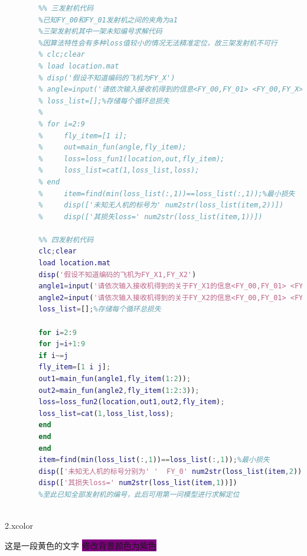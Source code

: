 \documentclass[withoutpreface,bwprint]{cumcmthesis}
\begin{document}
		\begin{lstlisting}[title=code1,frame=shadowbox,language=matlab]
		%% 第二问求解
		%% 三发射机代码
		%已知FY_00和FY_01发射机之间的夹角为a1
		%三架发射机其中一架未知编号求解代码
		%因算法特性会有多种loss值较小的情况无法精准定位，故三架发射机不可行
		% clc;clear
		% load location.mat
		% disp('假设不知道编码的飞机为FY_X')
		% angle=input('请依次输入接收机得到的信息<FY_00,FY_01> <FY_00,FY_X> <FY_01_X>（例如[20 20 40]）');
		% loss_list=[];%存储每个循环总损失
		% 
		% for i=2:9
		%     fly_item=[1 i];
		%     out=main_fun(angle,fly_item);
		%     loss=loss_fun1(location,out,fly_item);
		%     loss_list=cat(1,loss_list,loss);
		% end
		%     item=find(min(loss_list(:,1))==loss_list(:,1));%最小损失
		%     disp(['未知无人机的标号为' num2str(loss_list(item,2))])
		%     disp(['其损失loss=' num2str(loss_list(item,1))])
		
		%% 四发射机代码
		clc;clear
		load location.mat
		disp('假设不知道编码的飞机为FY_X1,FY_X2')
		angle1=input('请依次输入接收机得到的关于FY_X1的信息<FY_00,FY_01> <FY_00,FY_X1> <FY_01，FY_X1>（例如[20 20 40]）');
		angle2=input('请依次输入接收机得到的关于FY_X2的信息<FY_00,FY_01> <FY_00,FY_X2> <FY_01,FY_X2>（例如[20 20 40]）');
		loss_list=[];%存储每个循环总损失
		
		for i=2:9
		for j=i+1:9
		if i~=j
		fly_item=[1 i j];
		out1=main_fun(angle1,fly_item(1:2));
		out2=main_fun(angle2,fly_item(1:2:3));
		loss=loss_fun2(location,out1,out2,fly_item);
		loss_list=cat(1,loss_list,loss);
		end
		end
		end
		item=find(min(loss_list(:,1))==loss_list(:,1));%最小损失
		disp(['未知无人机的标号分别为' '  FY_0' num2str(loss_list(item,2)) ', FY_0' num2str(loss_list(item,3))])
		disp(['其损失loss=' num2str(loss_list(item,1))])
		%至此已知全部发射机的编号，此后可用第一问模型进行求解定位
		
	\end{lstlisting}


	
	
	
	
	
	\noindent 2.xcolor
	
	
	\textcolor{y}{这是一段黄色的文字}
	\colorbox{Purple}{修改背景颜色为紫色}
	
	
\end{document}
